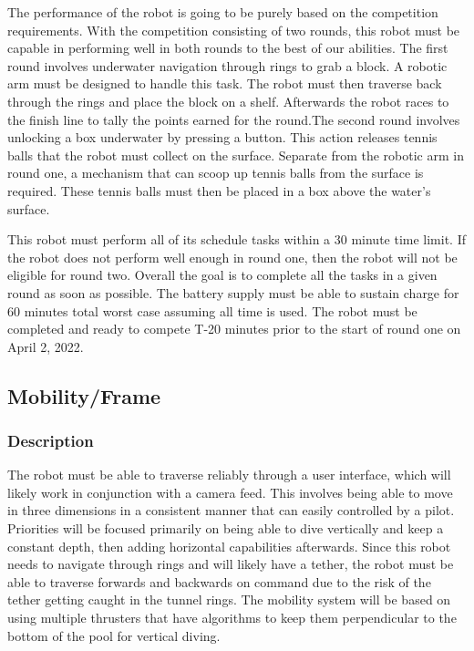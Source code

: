 The performance of the robot is going to be purely based on the competition requirements. With the competition consisting of two rounds, this robot must be capable in performing well in both rounds to the best of our abilities. The first round involves underwater navigation through rings to grab a block. A robotic arm must be designed to handle this task. The robot must then traverse back through the rings and place the block on a shelf. Afterwards the robot races to the finish line to tally the points earned for the round.The second round involves unlocking a box underwater by pressing a button. This action releases tennis balls that the robot must collect on the surface. Separate from the robotic arm in round one, a mechanism that can scoop up tennis balls from the surface is required. These tennis balls must then be placed in a box above the water's surface.


This robot must perform all of its schedule tasks within a 30 minute time limit. If the robot does not perform well enough in round one, then the robot will not be eligible for round two. Overall the goal is to complete all the tasks in a given round as soon as possible. The battery supply must be able to sustain charge for 60 minutes total worst case assuming all time is used. The robot must be completed and ready to compete T-20 minutes prior to the start of round one on April 2, 2022.


\subsection{Mobility/Frame}

\subsubsection{Description}

The robot must be able to traverse reliably through a user interface, which will likely work in conjunction with a camera feed. This involves being able to move in three dimensions in a consistent manner that can easily controlled by a pilot. Priorities will be focused primarily on being able to dive vertically and keep a constant depth, then adding horizontal capabilities afterwards. Since this robot needs to navigate through rings and will likely have a tether, the robot must be able to traverse forwards and backwards on command due to the risk of the tether getting caught in the tunnel rings. The mobility system will be based on using multiple thrusters that have algorithms to keep them perpendicular to the bottom of the pool for vertical diving. 

